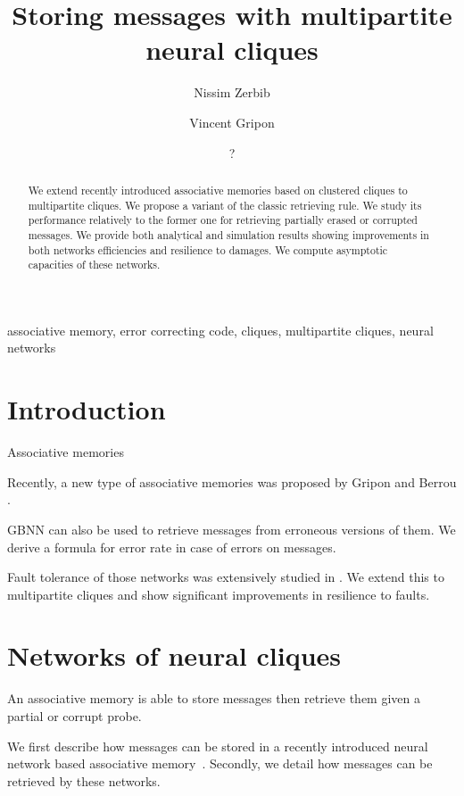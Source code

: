 \documentclass[english,10pt,twocolumn]{IEEEtran}
\title{Storing messages with multipartite neural cliques}
\author[]{Nissim Zerbib}
\affil{Département d'Informatique, École normale supérieure, Paris, France}
\author[]{Vincent Gripon}
\affil{Département d'Électronique, Télécom Bretagne, Brest, France}
\author{?}
\date{
	}
\theoremstyle{definition}
\begin{document}
	\maketitle

	 \begin{abstract}
	 	We extend recently introduced associative memories based on clustered cliques to multipartite cliques. We propose a variant of the classic retrieving rule. We study its performance relatively to the former one for retrieving partially erased or corrupted messages. We provide both analytical and simulation results showing improvements in both networks efficiencies and resilience to damages. We compute asymptotic capacities of these networks.
	 \end{abstract}
	 
	
	\begin{IEEEkeywords}
	associative memory, error correcting code, cliques, multipartite cliques, neural networks
	\end{IEEEkeywords}
	\section{Introduction}
	
		
		Associative memories
		
		Recently, a new type of associative memories was proposed by Gripon and Berrou \cite{GriBer20117}.
		
		GBNN can also be used to retrieve messages from erroneous versions of them. We derive a formula for error rate in case of errors on messages.
		
		Fault tolerance of those networks was extensively studied in \cite{LedGriRabGro20145}. We extend this to multipartite cliques and show significant improvements in resilience to faults.
	
	
	\section{Networks of neural cliques}
	
	An associative memory is able to store messages then retrieve them given a partial or corrupt probe.

	We first describe how messages can be stored in a recently introduced neural network based associative memory~\cite{}. Secondly, we detail how messages can be retrieved by these networks.
	
\end{document}
